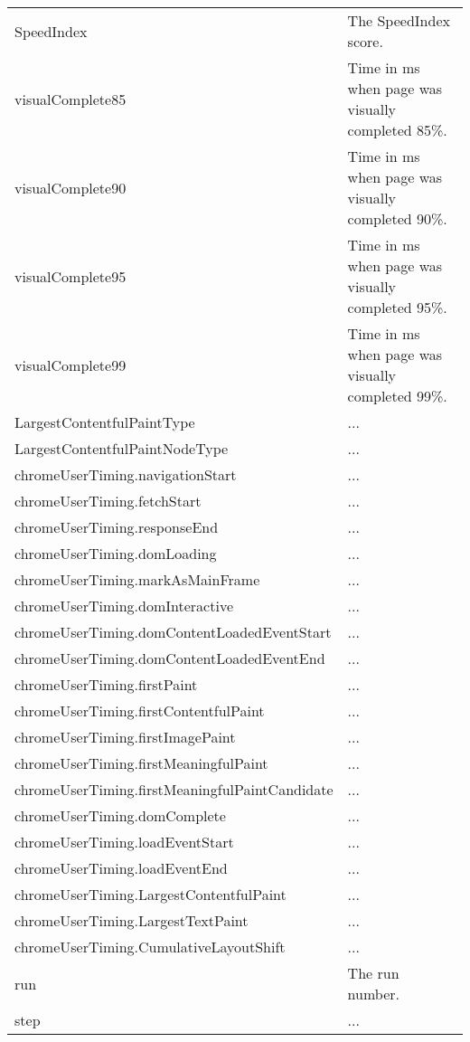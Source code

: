 \begin{center}
\begin{longtable}{ p{0.4\linewidth} | p{0.6\linewidth} }
        SpeedIndex & The SpeedIndex score. \\
        visualComplete85 & Time in ms when page was visually completed 85\%. \\
        visualComplete90 & Time in ms when page was visually completed 90\%. \\
        visualComplete95 & Time in ms when page was visually completed 95\%. \\
        visualComplete99 & Time in ms when page was visually completed 99\%. \\
        LargestContentfulPaintType & ... \\
        LargestContentfulPaintNodeType & ... \\
        chromeUserTiming.navigationStart & ... \\
        chromeUserTiming.fetchStart & ... \\
        chromeUserTiming.responseEnd & ... \\
        chromeUserTiming.domLoading & ... \\
        chromeUserTiming.markAsMainFrame & ... \\
        chromeUserTiming.domInteractive & ... \\
        chromeUserTiming.domContentLoadedEventStart & ... \\
        chromeUserTiming.domContentLoadedEventEnd & ... \\
        chromeUserTiming.firstPaint & ... \\
        chromeUserTiming.firstContentfulPaint & ... \\
        chromeUserTiming.firstImagePaint & ... \\
        chromeUserTiming.firstMeaningfulPaint & ... \\
        chromeUserTiming.firstMeaningfulPaintCandidate & ... \\
        chromeUserTiming.domComplete & ... \\
        chromeUserTiming.loadEventStart & ... \\
        chromeUserTiming.loadEventEnd & ... \\
        chromeUserTiming.LargestContentfulPaint & ... \\
        chromeUserTiming.LargestTextPaint & ... \\
        chromeUserTiming.CumulativeLayoutShift & ... \\
        run & The run number. \\
        step & ... \\

\end{longtable}
\end{center}
